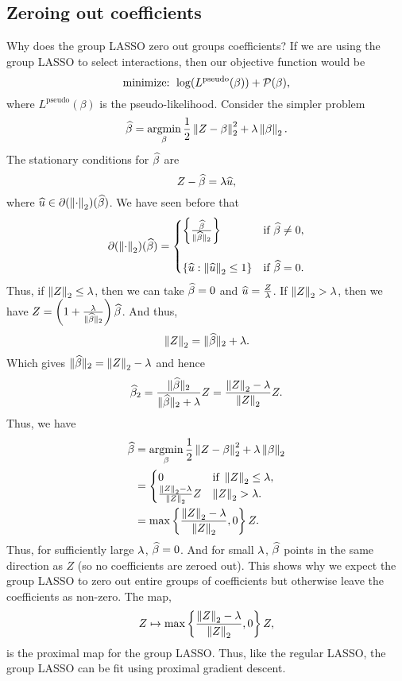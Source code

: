 \subsection{Zeroing out coefficients}
Why does the group LASSO zero out groups coefficients? If we are using the group LASSO to select interactions, then our objective function would be 
\[\text{minimize: } \log(L^{\text{pseudo}}(\beta)) + {\mathcal{P}}(\beta), \]
where $L^{\text{pseudo}}(\beta)$ is the pseudo-likelihood. Consider the simpler problem
\[\widehat{\beta} = \operatorname*{argmin}_\beta \frac{1}{2}\left\|Z-\beta\right\|_2^2 + \lambda \left\|\beta\right\|_2. \]
The stationary conditions for $\widehat{\beta}$ are 
\[Z-\widehat{\beta} = \lambda\widehat{u}, \]
where $\widehat{u} \in \partial(\left\|\cdot\right\|_2)(\widehat{\beta})$. We have seen before that 
\[ \partial(\left\|\cdot\right\|_2)(\widehat{\beta}) = \begin{cases}
    \left\{\frac{\widehat{\beta}}{\Vert\widehat{\beta}\Vert_2}\right\} & \text{if } \widehat{\beta} \neq 0,\\
    &\\
    \left\{\widehat{u}: \left\|\widehat{u}\right\|_2 \le 1\right\} &\text{if } \widehat{\beta}=0.
\end{cases}\]
Thus, if $\left\|Z\right\|_2 \le \lambda$, then we can take $\widehat{\beta}=0$ and $\widehat{u}=\frac{Z}{\lambda}$. If $\left\|Z\right\|_2 > \lambda$, then we have $Z = \left(1 + \frac{\lambda}{\Vert\widehat{\beta}\Vert_2}\right)\widehat{\beta}$. And thus,
\[\left\|Z\right\|_2 = \Vert \widehat{\beta}\Vert_2 + \lambda. \]
Which gives $\Vert \widehat{\beta}\Vert_2 = \left\|Z\right\|_2 -\lambda$ and hence 
\[\widehat{\beta}_2 = \frac{\Vert \widehat{\beta}\Vert_2}{\Vert \widehat{\beta}\Vert_2+\lambda}Z = \frac{\left\|Z\right\|_2-\lambda}{\left\|Z\right\|_2}Z. \]
Thus, we have 
\begin{align*}
    \widehat{\beta} &= \operatorname*{argmin}_\beta \frac{1}{2}\left\|Z-\beta\right\|_2^2 + \lambda \left\|\beta\right\|_2\\
    &=\begin{cases}
        0 & \text{if } \left\|Z\right\|_2 \le \lambda,\\
        \frac{\left\|Z\right\|_2-\lambda}{\left\|Z\right\|_2}Z & \left\|Z\right\|_2 > \lambda.
    \end{cases}\\
    &=\max\left\{\frac{\left\|Z\right\|_2-\lambda}{\left\|Z\right\|_2}, 0\right\}Z.
\end{align*}
Thus, for sufficiently large $\lambda$, $\widehat{\beta}=0$. And for small $\lambda$, $\widehat{\beta}$ points in the same direction as $Z$ (so no coefficients are zeroed out). This shows why we expect the group LASSO to zero out entire groups of coefficients but otherwise leave the coefficients as non-zero. The map,
\[Z \mapsto \max\left\{\frac{\left\|Z\right\|_2-\lambda}{\left\|Z\right\|_2}, 0\right\}Z, \]
is the proximal map for the group LASSO. Thus, like the regular LASSO, the group LASSO can be fit using proximal gradient descent.

